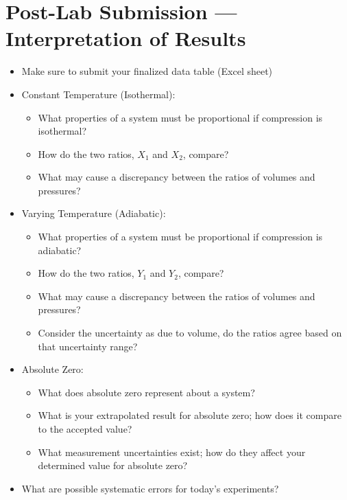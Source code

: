 \section{Post-Lab Submission --- Interpretation of Results}
\begin{itemize}
    \item Make sure to submit your finalized data table (Excel sheet)
    \item Constant Temperature (Isothermal):
        \begin{itemize}
            \item What properties of a system must be proportional if compression is isothermal?
            \item How do the two ratios, $X_{1}$ and $X_{2}$, compare?
            \item What may cause a discrepancy between the ratios of volumes and pressures?
        \end{itemize}
    \item Varying Temperature (Adiabatic):
        \begin{itemize}
            \item What properties of a system must be proportional if compression is adiabatic?
            \item How do the two ratios, $Y_{1}$ and $Y_{2}$, compare?
            \item What may cause a discrepancy between the ratios of volumes and pressures?
            \item Consider the uncertainty as due to volume, do the ratios agree based on that uncertainty range?
        \end{itemize}
    \item Absolute Zero:
        \begin{itemize}
            \item What does absolute zero represent about a system?
            \item What is your extrapolated result for absolute zero; how does it compare to the accepted value?
            \item What measurement uncertainties exist; how do they affect your determined value for absolute zero?
        \end{itemize}
    \item What are possible systematic errors for today's experiments?
\end{itemize}